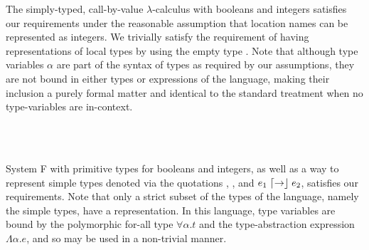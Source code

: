 \begin{ex}
  \label{ex:st-lambda}
  The simply-typed, call-by-value $\lambda$-calculus with booleans and integers satisfies our requirements under the reasonable assumption that location names can be represented as integers.
  We trivially satisfy the requirement of having representations of local types by using the empty type \Empty.
  Note that although type variables $\alpha$ are part of the syntax of types as required by our assumptions, they are not bound in either types or expressions of the language, making their inclusion a purely formal matter and identical to the standard treatment when no type-variables are in-context.
  \begin{syntax}
  	 \alternative{\alpha} \alternative{\Int} \alternative{\Bool} \alternative{\Empty} 
       \\
     \\
    \alternative{\True} \alternative{\False} 
  \end{syntax}
\end{ex}

\begin{ex}[System F]
  \label{ex:system-f}
  System F with primitive types for booleans and integers, as well as a way to represent simple types denoted via the quotations \say{\Int}, \say{\Bool}, and $e_1 \mathrel{\lceil\mathord{\to}\rfloor} e_2$, satisfies our requirements.
  Note that only a strict subset of the types of the language, namely the simple types, have a representation.
  In this language, type variables are bound by the polymorphic for-all type $\forall \alpha.t$ and the type-abstraction expression $\Lambda \alpha.e$, and so may be used in a non-trivial manner.
  \begin{syntax}
  	 \alternative{\alpha} \alternative{\Int} \alternative{\Bool} \alternative{\Typ}\\
  	 
         \\
     \\
    \alternative{\True} \alternative{\False} \\
    \alternative{\say{\Int}} \alternative{\say{\Bool}} 
  \end{syntax}
\end{ex}

